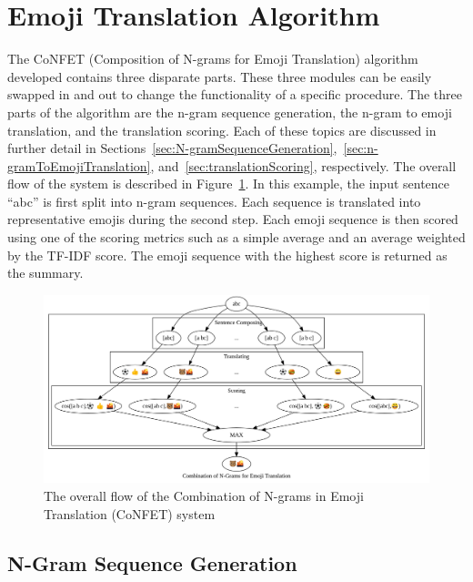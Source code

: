 \documentclass{article}[10]
\begin{document}
\section{Emoji Translation Algorithm\label{sec:EmojiTranslationAlgorithm}}

The CoNFET (Composition of N-grams for Emoji Translation) algorithm developed contains three disparate parts. These three modules can be easily swapped in and out to change the functionality of a specific procedure. The three parts of the algorithm are the n-gram sequence generation, the n-gram to emoji translation, and the translation scoring. Each of these topics are discussed in further detail in Sections~\ref{sec:N-gramSequenceGeneration},~\ref{sec:n-gramToEmojiTranslation}, and~\ref{sec:translationScoring}, respectively. The overall flow of the system is described in Figure~\ref{fig:flow}. In this example, the input sentence ``abc'' is first split into n-gram sequences. Each sequence is translated into representative emojis during the second step. Each emoji sequence is then scored using one of the scoring metrics such as a simple average and an average weighted by the TF-IDF score. The emoji sequence with the highest score is returned as the summary.

\begin{figure}[h]
  \begin{center}
    \includegraphics[width=1.0\textwidth]{figures/flow.png}
    \caption{The overall flow of the Combination of N-grams in Emoji Translation
      (CoNFET) system\label{fig:flow}}
  \end{center}
\end{figure}

\subsection{N-Gram Sequence Generation\label{sec:N-gramSequenceGeneration}}
\end{document}
